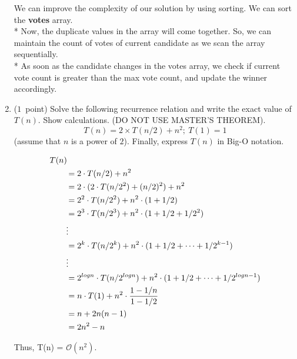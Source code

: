 \documentclass[14pt]{article}
\begin{document}
\begin{enumerate}[label=\alph*)]
    \begin{myframe}[width=500pt,height=130pt,top=2pt,bottom=2.5pt,left=2pt,right=2pt,arc=10pt,auto outer arc]
    We can improve the complexity of our solution by using sorting. We can sort the \textbf{votes} array. \\*
    Now, the duplicate values in the array will come together. So, we can maintain the count of votes of current candidate as we scan the array sequentially. \\*
    As soon as the candidate changes in the votes array, we check if current vote count is greater than the max vote count, and update the winner accordingly.
    \end{myframe}
    
    \item ($1$\ point)
    Solve the following recurrence relation and write the exact value of $T(n).$ Show calculations. (DO NOT USE MASTER'S THEOREM).
    \[T(n) = 2 \times T(n/2) + n^2; \ T(1) = 1 \]
    (assume that $n$ is a power of $2$). Finally, express $T(n)$ in Big-O notation.
    
    \begin{myframe}[width=500pt,height=320pt,top=2pt,bottom=2.5pt,left=2pt,right=2pt,arc=10pt,auto outer arc]
    \begin{align*}
      \hspace{2em}&\hspace{-2em} T(n) \\
      &= 2 \cdot T(n/2) + n^2 \\
      &= 2 \cdot (2 \cdot T(n/2^{2}) + (n/2)^{2}) + n^2 \\
      &= 2^2 \cdot T(n/2^2) + n^2 \cdot (1 + 1/2) \\
      &= 2^3 \cdot T(n/2^3) + n^2 \cdot (1 + 1/2 + 1/2^2) \\
      &\vdots\\
      &= 2^k \cdot T(n/2^k) + n^2 \cdot (1 + 1/2 + \cdots + 1/2^{k-1}) \\
      &\vdots\\
      &= 2^{logn} \cdot T(n/2^{logn}) + n^2 \cdot (1 + 1/2 + \cdots + 1/2^{logn - 1}) \\
      &= n \cdot T(1) + n^2 \cdot \frac{1 - 1/n}{1 - 1/2} \\
      &= n + 2n(n - 1) \\
      &= 2n^2 - n
    \end{align*}
    \begin{center}
    Thus, T(n) = $\mathcal{O}(n^2)$.
    \end{center}
    \end{myframe}
    

\end{enumerate}
\end{document}
